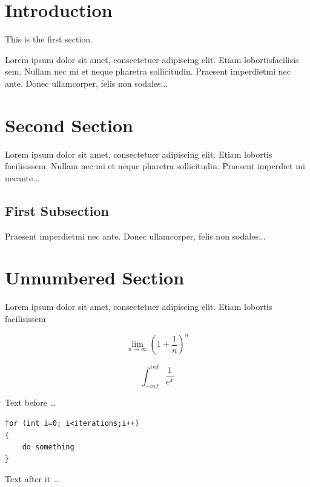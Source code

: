 \documentclass[12pt, a4paper]{article}
\begin{document}
\section{Introduction}

This is the first section.

Lorem  ipsum  dolor  sit  amet,  consectetuer  adipiscing
elit.   Etiam  lobortisfacilisis sem.  Nullam nec mi et
neque pharetra sollicitudin.  Praesent imperdietmi nec ante.
Donec ullamcorper, felis non sodales...
\section{Second Section}

Lorem ipsum dolor sit amet, consectetuer adipiscing elit.
Etiam lobortis facilisissem.  Nullam nec mi et neque pharetra
sollicitudin.  Praesent imperdiet mi necante...

\subsection{First Subsection}
Praesent imperdietmi nec ante. Donec ullamcorper, felis non sodales...

\section*{Unnumbered Section}
Lorem ipsum dolor sit amet, consectetuer adipiscing elit.
Etiam lobortis facilisissem

$$ \lim_{n \to \infty} (1 + \frac{1}{n})^n $$


$$\int_{-inf}^{inf} \frac{1}{e^x} $$

Text before \dots
\begin{lstlisting}
for (int i=0; i<iterations;i++)
{
    do something
}
\end{lstlisting}
Text after it \dots
\end{document}
